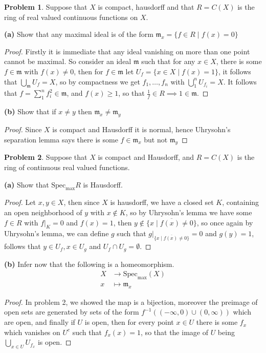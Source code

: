 \documentclass[10.5pt]{article}
\theoremstyle{definition}
\newtheorem{pb}{Problem}
\newcommand{\set}[1]{\{#1\}}
\begin{document}
    \begin{pb}
        Suppose that \(X\) is compact, hausdorff and that \(R = C(X)\) is the ring of real valued continuous functions on \(X\).

        \textbf{(a)} Show that any maximal ideal is of the form \(\mathfrak{m}_x = \set{f \in R \mid f(x) = 0}\)
        \begin{proof}
            Firstly it is immediate that any ideal vanishing on more than one point cannot be maximal. So consider an ideal \(\mathfrak{m}\) such that for any \(x \in X\), there is some \(f \in \mathfrak{m}\) with \(f(x) \neq 0\), then for \(f \in \mathfrak{m}\) let \(U_f = \set{x \in X \mid f(x) = 1}\), it follows that \(\bigcup_{\mathfrak{m}}U_f = X\), so by compactness we get \(f_1,\hdots, f_n\) with \(\bigcup_1^n U_{f_i} = X\). It follows that \(f = \sum_1^n f_i^2 \in \mathfrak{m}\), and \(f(x) \geq 1\), so that \(\frac{1}{f} \in R \implies 1 \in \mathfrak{m}\).
        \end{proof}

        \textbf{(b)} Show that if \(x \neq y\) then \(\mathfrak{m}_x \neq \mathfrak{m}_y\)
        \begin{proof}
            Since \(X\) is compact and Hausdorff it is normal, hence Uhrysohn's separation lemma says there is some \(f \in \mathfrak{m}_x\) but not \(\mathfrak{m}_y\)
        \end{proof}
    \end{pb}
    \begin{pb}
        Suppose that \(X\) is compact and Hausdorff, and \(R = C(X)\) is the ring of continuous real valued functions.

        \textbf{(a)} Show that \(\text{Spec}_{\max} R\) is Hausdorff.
        \begin{proof}
            Let \(x,y \in X\), then since \(X\) is hausdorff, we have a closed set \(K\), containing an open neighborhood of \(y\) with \(x \not \in K\), so by Uhrysohn's lemma we have some \(f \in R\) with \(f\vert_K = 0\) and \(f(x) = 1\), then \(y \not \in \overline{\set{x \mid f(x) \neq 0}}\), so once again by Uhrysohn's lemma, we can define \(g\) such that \(g\vert_{\overline{\set{x \mid f(x) \neq 0}}} = 0\) and \(g(y) = 1\), follows that \(y \in U_f, x \in U_g\) and \(U_f \cap U_g = \emptyset\).
        \end{proof}
        \textbf{(b)} Infer now that the following is a homeomorphism.
        \begin{align*}
            X &\to \text{Spec}_{\max}(X) \\ x &\mapsto \mathfrak{m}_x
        \end{align*}
        \begin{proof}
            In problem 2, we showed the map is a bijection, moreover the preimage of open sets are generated by sets of the form \(f^{-1}\left((-\infty,0)\cup(0,\infty)\right)\) which are open, and finally if \(U\) is open, then for every point \(x \in U\) there is some \(f_x\) which vanishes on \(U^c\) such that \(f_x(x) = 1\), so that the image of \(U\) being \(\bigcup_{x\in U} U_{f_x}\) is open.
        \end{proof}
    \end{pb}
\end{document}
